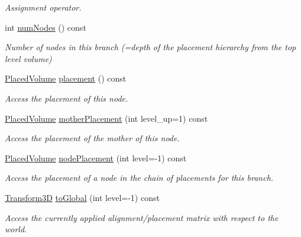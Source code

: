 \begin{DoxyCompactItemize}
\begin{DoxyCompactList}\small\item\em Assignment operator. \end{DoxyCompactList}\item 
int \hyperlink{class_d_d4hep_1_1_alignments_1_1_global_alignment_af98ddcc7a707a635f9e7545faadf4fb5}{num\+Nodes} () const
\begin{DoxyCompactList}\small\item\em Number of nodes in this branch (=depth of the placement hierarchy from the top level volume) \end{DoxyCompactList}\item 
\hyperlink{class_d_d4hep_1_1_geometry_1_1_placed_volume}{Placed\+Volume} \hyperlink{class_d_d4hep_1_1_alignments_1_1_global_alignment_a86507e649b9f619db6731be3a3c482b5}{placement} () const
\begin{DoxyCompactList}\small\item\em Access the placement of this node. \end{DoxyCompactList}\item 
\hyperlink{class_d_d4hep_1_1_geometry_1_1_placed_volume}{Placed\+Volume} \hyperlink{class_d_d4hep_1_1_alignments_1_1_global_alignment_a546653105428014c4917ca502dc63e4b}{mother\+Placement} (int level\+\_\+up=1) const
\begin{DoxyCompactList}\small\item\em Access the placement of the mother of this node. \end{DoxyCompactList}\item 
\hyperlink{class_d_d4hep_1_1_geometry_1_1_placed_volume}{Placed\+Volume} \hyperlink{class_d_d4hep_1_1_alignments_1_1_global_alignment_a26def28356fd35a0f294d58aa615cce4}{node\+Placement} (int level=-\/1) const
\begin{DoxyCompactList}\small\item\em Access the placement of a node in the chain of placements for this branch. \end{DoxyCompactList}\item 
\hyperlink{class_d_d4hep_1_1_alignments_1_1_global_alignment_a328240cbc53ba92424336a5898ba49d3}{Transform3D} \hyperlink{class_d_d4hep_1_1_alignments_1_1_global_alignment_a53f3fe1ad33103497a3ac4dca394e33d}{to\+Global} (int level=-\/1) const
\begin{DoxyCompactList}\small\item\em Access the currently applied alignment/placement matrix with respect to the world. \end{DoxyCompactList}\item 

\end{DoxyCompactItemize}
